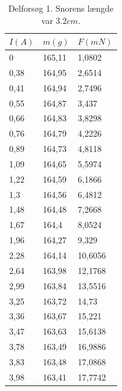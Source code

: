 \documentclass[10pt,a4paper]{article}
\theoremstyle{break}
\theoremstyle{nonumberplain}
\begin{document}
\begin{table}[h]
\centering
\begin{tabular}{|l|ll|}
\hline
\textbf{$I (A)$} & \textbf{$m(g)$} & \textbf{$F(mN)$} \\ \hline
0                & 165,11          & 1,0802          \\
0,38             & 164,95          & 2,6514          \\
0,41             & 164,94          & 2,7496          \\
0,55             & 164,87          & 3,437           \\
0,66             & 164,83          & 3,8298          \\
0,76             & 164,79          & 4,2226          \\
0,89             & 164,73          & 4,8118          \\
1,09             & 164,65          & 5,5974          \\
1,22             & 164,59          & 6,1866          \\
1,3              & 164,56          & 6,4812          \\
1,48             & 164,48          & 7,2668          \\
1,67             & 164,4           & 8,0524          \\
1,96             & 164,27          & 9,329           \\
2,28             & 164,14          & 10,6056         \\
2,64             & 163,98          & 12,1768         \\
2,99             & 163,84          & 13,5516         \\
3,25             & 163,72          & 14,73           \\
3,36             & 163,67          & 15,221          \\
3,47             & 163,63          & 15,6138         \\
3,78             & 163,49          & 16,9886         \\
3,83             & 163,48          & 17,0868         \\
3,98             & 163,41          & 17,7742         \\
\hline

\end{tabular}
\caption{Delforsøg 1. Snorens længde var $3.2 cm$.}
\end{table}
\end{document}

